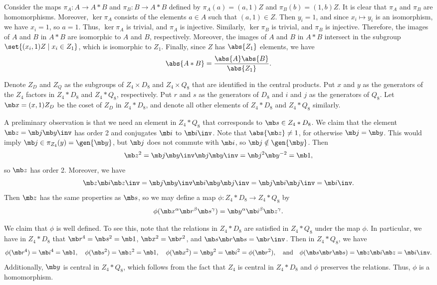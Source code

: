 \begin{solenum}
    \item Consider the maps $\pi_A \colon A \to A \ast B$ and $\pi_B \colon B \to A \ast B$ defined by $\pi_A(a) = (a, 1)Z$ and $\pi_B(b) = (1, b)Z$.
	It is clear that $\pi_A$ and $\pi_B$ are homomorphisms.
	Moreover, $\ker\pi_A$ consists of the elements $a \in A$ such that $(a, 1) \in Z$.
	Then $y_i = 1$, and since $x_i \mapsto y_i$ is an isomorphism, we have $x_i = 1$, so $a = 1$.
	Thus, $\ker\pi_A$ is trivial, and $\pi_A$ is injective.
	Similarly, $\ker\pi_B$ is trivial, and $\pi_B$ is injective.
	Therefore, the images of $A$ and $B$ in $A \ast B$ are isomorphic to $A$ and $B$, respectively.
	Moreover, the images of $A$ and $B$ in $A \ast B$ intersect in the subgroup $\set{(x_i, 1)Z \mid x_i \in Z_1}$, which is isomorphic to $Z_1$.
	Finally, since $Z$ has $\abs{Z_1}$ elements, we have
    \[
    	\abs{A \ast B} = \frac{\abs{A}\abs{B}}{\abs{Z_1}}.
    \]
    \item Denote $Z_D$ and $Z_Q$ as the subgroups of $Z_4 \times D_8$ and $Z_4 \times Q_8$ that are identified in the central products.
    Put $x$ and $y$ as the generators of the $Z_4$ factors in $Z_4 \ast D_8$ and $Z_4 \ast Q_8$, respectively.
    Put $r$ and $s$ as the generators of $D_8$ and $i$ and $j$ as the generators of $Q_8$.
    Let $\mb x = (x, 1)Z_D$ be the coset of $Z_D$ in $Z_4 \ast D_8$, and denote all other elements of $Z_4 \ast D_8$ and $Z_4 \ast Q_8$ similarly.

    A preliminary observation is that we need an element in $Z_4 \ast Q_8$ that corresponds to $\mb s \in Z_4 \ast D_8$.
    We claim that the element $\mb z = \mb j \mb y\inv$ has order 2 and conjugates $\mb i$ to $\mb i\inv$.
    Note that $\abs{\mb z} \neq 1$, for otherwise $\mb j = \mb y$. This would imply $\mb j \in \pi_{Z_4}(y) = \gen{\mb y}$, but $\mb j$ does not commute with $\mb i$, so $\mb j \notin \gen{\mb y}$. Then
    \[
        \mb z^2 = \mb j \mb y\inv \mb j \mb y\inv = \mb j^2 \mb y^{-2} = \mb 1,
    \]
    so $\mb z$ has order 2.
    Moreover, we have
    \[
        \mb z \mb i \mb z\inv = \mb j \mb y\inv \mb i \mb y \mb j\inv = \mb j \mb i \mb j\inv = \mb i\inv.
    \]
    Then $\mb z$ has the same properties as $\mb s$, so we may define a map $\phi \colon Z_4 \ast D_8 \to Z_4 \ast Q_8$ by
    \[
        \phi(\mb x^\alpha \mb r^\beta \mb s^\gamma) = \mb y^\alpha \mb i^\beta \mb z^\gamma.
    \]

    We claim that $\phi$ is well defined.
    To see this, note that the relations in $Z_4 \ast D_8$ are satisfied in $Z_4 \ast Q_8$ under the map $\phi$.
    In particular, we have in $Z_4 \ast D_8$ that $\mb r^4 = \mb s^2 = \mb 1$, $\mb x^2 = \mb r^2$, and $\mb s\mb r\mb s = \mb r\inv$.
    Then in $Z_4 \ast Q_8$, we have
    \[
        \phi(\mb r^4) = \mb i^4 = \mb 1, \quad \phi(\mb s^2) = \mb z^2 = \mb 1, \quad \phi(\mb x^2) = \mb y^2 = \mb i^2 = \phi(\mb r^2), \quad \text{and} \quad \phi(\mb s\mb r\mb s) = \mb z\mb i\mb z = \mb i\inv.
    \]
    Additionally, $\mb y$ is central in $Z_4 \ast Q_8$, which follows from the fact that $Z_4$ is central in $Z_4 \ast D_8$ and $\phi$ preserves the relations.
    Thus, $\phi$ is a homomorphism.


\end{solenum}
